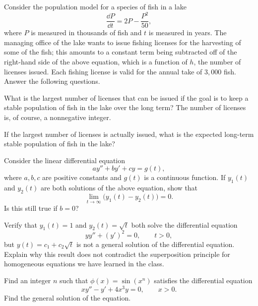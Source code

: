 \begin{problem}
Consider the population model for a species of fish in a lake
\[
\frac{\dd P}{\dd t}=2P-\frac{P^2}{50},
\]
where $P$ is measured in thousands of fish and $t$ is measured in years. The managing office of the lake wants to issue fishing licenses for the harvesting of some of the fish; this amounts to a constant term being subtracted off of the right-hand side of the above equation, which is a function of $h$, the number of licenses issued. Each fishing license is valid for the annual take of $3{,}000$ fish. Answer the following questions.
\begin{problemsubparts}
\item What is the largest number of licenses that can be issued if the goal is to keep a stable population of fish in the lake over the long term? The number of licenses is, of course, a nonnegative integer.
\item If the largest number of licenses is actually issued, what is the expected long-term stable population of fish in the lake?
\end{problemsubparts}
\end{problem}

\begin{problem}
Consider the linear differential equation
\[
ay''+by'+cy=g(t),
\]
where $a,b,c$ are positive constants and $g(t)$ is a continuous function. If $y_1(t)$ and $y_2(t)$ are both solutions of the above equation, show that
\[
\lim_{t\to\infty}\bigl(y_1(t)-y_2(t)\bigr)=0.
\]
Is this still true if $b=0$?
\end{problem}

\begin{problem}
Verify that $y_1(t)=1$ and $y_2(t)=\sqrt{t}$ both solve the differential equation
\[
yy''+(y')^2=0,
\qquad t>0,
\]
but $y(t)=c_1+c_2\sqrt{t}$ is not a general solution of the differential equation. Explain why this result does not contradict the superposition principle for homogeneous equations we have learned in the class.
\end{problem}

\begin{problem}
Find an integer $n$ such that $\phi(x)=\sin(x^n)$ satisfies the differential equation
\[
xy''-y'+4x^3y=0,
\qquad x>0.
\]
Find the general solution of the equation.
\end{problem}

